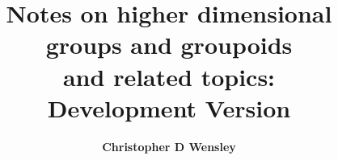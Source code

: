 \documentclass[11pt,a4paper]{article}
\begin{document}
  \title
  {\bf Notes on higher dimensional groups and groupoids \\
       and related topics:\\
       Development Version}
    \author{{\bf Christopher D Wensley}}
  \maketitle

\tableofcontents


\newpage 

\newpage 

\newpage 

\newpage 


\newpage 

\newpage 

\newpage 

\newpage 

\newpage  


\newpage  
 

\newpage 

\newpage  

\newpage 

\newpage  
 

\newpage 

\newpage 

\newpage 

\newpage 

\newpage 

\newpage  

\printindex
\end{document}
